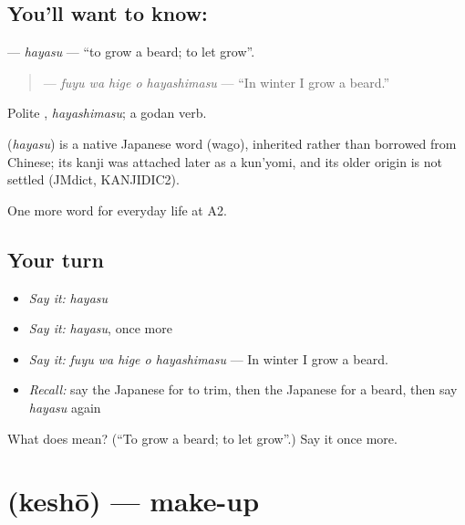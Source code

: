 \subsection*{You'll want to know: }
\textbf{} — \emph{hayasu} — \textquotedblleft{}to grow a beard; to let grow\textquotedblright{}.

\begin{quote}
\textbf{  } — \emph{fuyu wa hige o hayashimasu} — \textquotedblleft{}In winter I grow a beard.\textquotedblright{}
\end{quote}

Polite \textbf{}, \emph{hayashimasu}; a godan verb.

\begin{cousinweb}
\textbf{} (\emph{hayasu}) is a native Japanese word (wago), inherited rather than borrowed from Chinese; its kanji was attached later as a kun'yomi, and its older origin is not settled (JMdict, KANJIDIC2).
\end{cousinweb}

\begin{grammarlens}[title={What you've built}]
One more word for everyday life at A2.
\end{grammarlens}

\subsection*{Your turn}
\begin{itemize}
\raggedright
  \item \emph{Say it:} \emph{hayasu}
  \item \emph{Say it:} \emph{hayasu}, once more
  \item \emph{Say it:} \emph{fuyu wa hige o hayashimasu} — In winter I grow a beard.
  \item \emph{Recall:} say the Japanese for to trim, then the Japanese for a beard, then say \emph{hayasu} again
\end{itemize}

\begin{tcolorbox}[breakable,colback=teal!4,colframe=teal!35!black,title={Before you move on}]
What does  mean? (\textquotedblleft{}To grow a beard; to let grow\textquotedblright{}.) Say it once more.
\end{tcolorbox}
\section[\texorpdfstring{\ja{けしょう} (keshō)}{けしょう (keshō)}]{ (keshō) — make-up}

